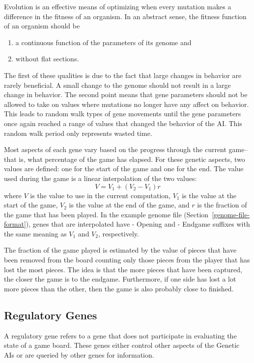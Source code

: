 \documentclass[letterpaper]{article}
\newcommand{\code}[1]{\small\textsf{#1}}
\renewcommand{\_}{\allowbreak\textunderscore\allowbreak}
\begin{document}
Evolution is an effective means of optimizing when every mutation makes a difference in the fitness of an organism. In an abstract sense, the fitness function of an organism should be
\begin{enumerate}
	\item a continuous function of the parameters of its genome and
	\item without flat sections.
\end{enumerate}
The first of these qualities is due to the fact that large changes in behavior are rarely beneficial. A small change to the genome should not result in a large change in behavior. The second point means that gene parameters should not be allowed to take on values where mutations no longer have any affect on behavior. This leads to random walk types of gene movements until the gene parameters once again reached a range of values that changed the behavior of the AI\@. This random walk period only represents wasted time.

Most aspects of each gene vary based on the progress through the current game--that is, what percentage of the game has elapsed. For these genetic aspects, two values are defined: one for the start of the game and one for the end. The value used during the game is a linear interpolation of the two values:
\[
V = V_1 + (V_2 - V_1)r
\]
where \(V\) is the value to use in the current computation, \(V_1\) is the value at the start of the game, \(V_2\) is the value at the end of the game, and \(r\) is the fraction of the game that has been played. In the example genome file (Section~\ref{genome-file-format}), genes that are interpolated have \code{- Opening} and \code{- Endgame} suffixes with the same meaning as \(V_1\) and \(V_2\), respectively.

The fraction of the game played is estimated by the value of pieces that have been removed from the board counting only those pieces from the player that has lost the most pieces. The idea is that the more pieces that have been captured, the closer the game is to the endgame. Furthermore, if one side has lost a lot more pieces than the other, then the game is also probably close to finished.

\subsection{Regulatory Genes}
A regulatory gene refers to a gene that does not participate in evaluating the state of a game board. These genes either control other aspects of the Genetic AIs or are queried by other genes for information.
\end{document}
